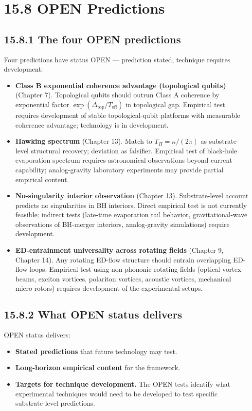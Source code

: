 \documentclass[11pt]{book}
\begin{document}
\section{15.8 OPEN Predictions}

\subsection{15.8.1 The four OPEN predictions}

Four predictions have status OPEN — prediction stated, technique requires development:

\begin{itemize}
\item \textbf{Class B exponential coherence advantage (topological qubits)} (Chapter 7). Topological qubits should outrun Class A coherence by exponential factor $\exp(\Delta_\mathrm{top}/T_\mathrm{eff})$ in topological gap. Empirical test requires development of stable topological-qubit platforms with measurable coherence advantage; technology is in development.
\item \textbf{Hawking spectrum} (Chapter 13). Match to $T_H = \kappa/(2\pi)$ as substrate-level structural recovery; deviation as falsifier. Empirical test of black-hole evaporation spectrum requires astronomical observations beyond current capability; analog-gravity laboratory experiments may provide partial empirical content.
\item \textbf{No-singularity interior observation} (Chapter 13). Substrate-level account predicts no singularities in BH interiors. Direct empirical test is not currently feasible; indirect tests (late-time evaporation tail behavior, gravitational-wave observations of BH-merger interiors, analog-gravity simulations) require development.
\item \textbf{ED-entrainment universality across rotating fields} (Chapter 9, Chapter 14). Any rotating ED-flow structure should entrain overlapping ED-flow loops. Empirical test using non-phononic rotating fields (optical vortex beams, exciton vortices, polariton vortices, acoustic vortices, mechanical micro-rotors) requires development of the experimental setups.
\end{itemize}

\subsection{15.8.2 What OPEN status delivers}

OPEN status delivers:
\begin{itemize}
\item \textbf{Stated predictions} that future technology may test.
\item \textbf{Long-horizon empirical content} for the framework.
\item \textbf{Targets for technique development.} The OPEN tests identify what experimental techniques would need to be developed to test specific substrate-level predictions.
\end{itemize}
\end{document}
